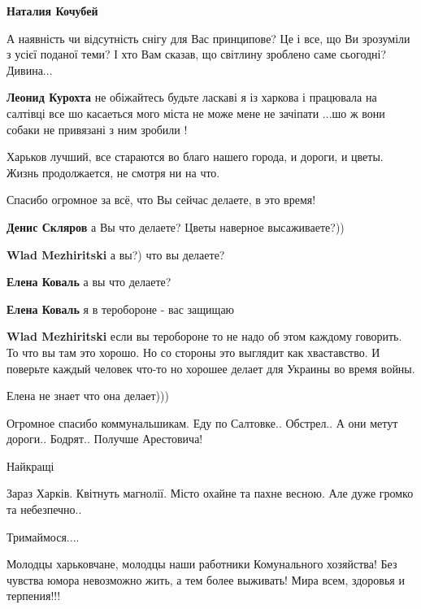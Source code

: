 \begin{itemize}
\begin{itemize}
\begin{itemize}
\textbf{Наталия Кочубей} 

А наявність чи відсутність снігу для Вас принципове? Це і все, що Ви зрозуміли
з усієї поданої теми? І хто Вам сказав, що світлину зроблено саме сьогодні?
Дивина...

\textbf{Леонид Курохта} не обіжайтесь будьте ласкаві я із харкова і працювала на салтівці все шо касаеться мого міста не може мене не зачіпати ...шо ж вони собаки не привязані з ним зробили !
\end{itemize} %


Харьков лучший, все стараются во благо нашего города, и дороги, и цветы. Жизнь
продолжается, не смотря ни на что.

\end{itemize} %

Спасибо огромное за всё, что Вы сейчас делаете, в это время!

\begin{itemize} %
\textbf{Денис Скляров} а Вы что делаете? Цветы наверное высаживаете?))

\textbf{Wlad Mezhiritski} а вы?) что вы делаете?

\textbf{Елена Коваль} а вы что делаете?

\textbf{Елена Коваль} я в теробороне - вас защищаю

\textbf{Wlad Mezhiritski} если вы теробороне то не надо об этом каждому говорить. То что вы там это хорошо. Но со стороны это выглядит как хваставство. И поверьте каждый человек что-то но хорошее делает для Украины во время войны.

Елена не знает что она делает)))
\end{itemize} %

Огромное спасибо коммунальшикам. Еду по Салтовке.. Обстрел.. А они метут дороги.. Бодрят.. Получше Арестовича!

Найкращі


Зараз Харків. Квітнуть магнолії. Місто охайне та пахне весною. Але дуже громко та небезпечно..

Тримаймося....


Молодцы харьковчане, молодцы наши работники Комунального хозяйства! Без чувства
юмора невозможно жить, а тем более выживать! Мира всем, здоровья и терпения!!!


\end{itemize}
